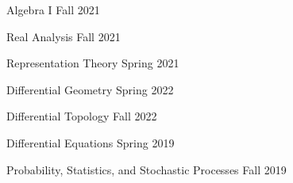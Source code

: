 \begin{multicols}{2}
\vspace{3ex}




\begin{cvcourseworks}

  \cvcoursework
    {Algebra I} %
    {} %
    {} %
    {Fall 2021} %

  \cvcoursework
    {Real Analysis} %
    {} %
    {} %
    {Fall 2021} %

  \cvcoursework
    {Representation Theory} %
    {} %
    {} %
    {Spring 2021} %

  \cvcoursework
    {Differential Geometry} %
    {} %
    {} %
    {Spring 2022} %

  \cvcoursework
    {Differential Topology} %
    {} %
    {} %
    {Fall 2022} %


\end{cvcourseworks}


\columnbreak


\begin{cvcourseworks}


  \cvcoursework
    {Differential Equations} %
    {} %
    {} %
    {Spring 2019} %

  \cvcoursework
    {Probability, Statistics, and Stochastic Processes} %
    {} %
    {} %
    {Fall 2019} %


\end{cvcourseworks}
\end{multicols}
